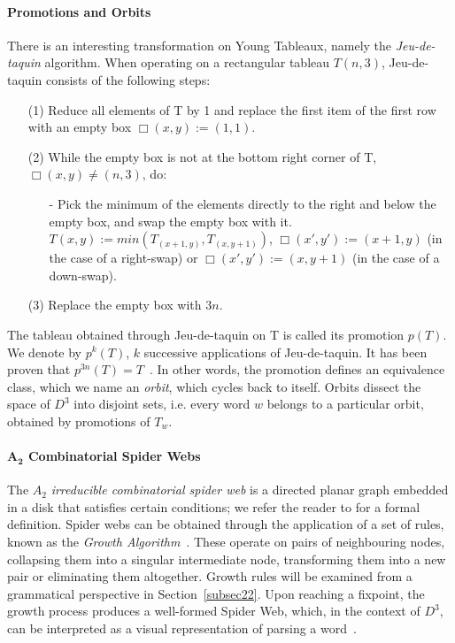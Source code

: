 \documentclass{llncs}
\begin{document}
\paragraph{\textbf{Promotions and Orbits}}
There is an interesting transformation on Young Tableaux, namely the \textit{Jeu-de-taquin} algorithm. When operating on a rectangular tableau $T(n,3)$, Jeu-de-taquin consists of the following steps:
\begin{enumerate}
\item[(1)] Reduce all elements of T by 1 and replace the first item of the first row with an empty box $ \Box (x,y) := (1,1)$.
\item[(2)] While the empty box is not at the bottom right corner of T, $ \Box(x,y) \neq (n,3)$, do:
\begin{enumerate}
\item[-] Pick the minimum of the elements directly to the right and below the empty box, and swap the empty box with it. $ T(x, y) := min(T_{(x+1,y)}, T_{(x,y+1)})$, $ \Box (x',y') := (x+1, y)$ (in the case of a right-swap) or $\Box (x',y') := (x,y+1)$ (in the case of a down-swap).
\end{enumerate}
\item[(3)] Replace the empty box with $3n$.
\end{enumerate}

The tableau obtained through Jeu-de-taquin on T is called its promotion $p(T)$. We denote by $p^k(T)$, $k$ successive applications of Jeu-de-taquin. It has been proven that $p^{3n}(T)=T$~\cite{petersen}. In other words, the promotion defines an equivalence class, which we name an \textit{orbit}, which cycles back to itself. Orbits dissect the space of $D^3$ into disjoint sets, i.e. every word $w$ belongs to a particular orbit, obtained by promotions of $T_w$.

\paragraph{\textbf{$\mathbf{A_2}$ Combinatorial Spider Webs}}
The $A_2$ \textit{irreducible combinatorial spider web} is a directed planar graph embedded in a disk that satisfies certain conditions; we refer the reader to \cite{kuperberg} for a formal definition. Spider webs can be obtained through the application of a set of rules, known as the \textit{Growth Algorithm}~\cite{petersen}. These operate on pairs of neighbouring nodes, collapsing them into a singular intermediate node, transforming them into a new pair or eliminating them altogether. Growth rules will be examined from a grammatical perspective in Section~\ref{subsec22}. Upon reaching a fixpoint, the growth process produces a well-formed Spider Web, which, in the context of $D^3$, can be interpreted as a visual representation of parsing a word~\cite{moortgat,petersen}.
\end{document}
